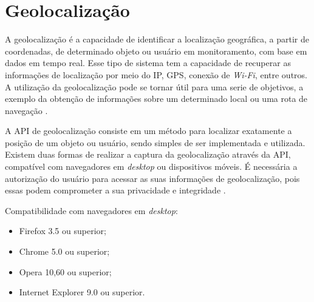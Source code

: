 \section{Geolocalização}


A geolocalização é a capacidade de identificar a localização geográfica, a partir de coordenadas, de determinado objeto ou usuário em monitoramento, com base em dados em tempo real. Esse tipo de sistema tem a capacidade de recuperar as informações de localização por meio do IP, GPS, conexão de \textit{Wi-Fi}, entre outros. A utilização da geolocalização pode se tornar útil para uma serie de objetivos, a exemplo da obtenção de informações sobre um determinado local ou uma rota de navegação \cite{geolocalizacao:2011}.

A API de geolocalização consiste em um método para localizar exatamente a posição de um objeto ou usuário, sendo simples de ser implementada e utilizada. Existem duas formas de realizar a captura da geolocalização através da API, compatível com navegadores em \textit{desktop} ou dispositivos móveis. É necessária a autorização do usuário para acessar as suas informações de geolocalização, pois essas podem comprometer a sua privacidade e integridade \cite{geolocalizacao:2011}.

Compatibilidade com navegadores em \textit{desktop}:
\begin{itemize}
    \item Firefox 3.5 ou superior;
    \item Chrome 5.0 ou superior;
    \item Opera 10,60 ou superior;
    \item Internet Explorer 9.0 ou superior. \\
\end{itemize}

